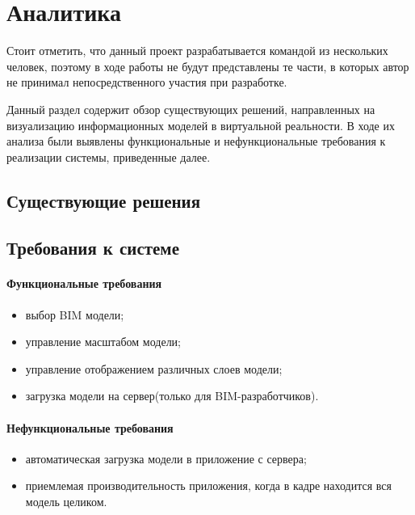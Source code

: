﻿\section{Аналитика}

Стоит отметить, что данный проект разрабатывается командой из нескольких человек,
поэтому в ходе работы не будут представлены те части,
в которых автор не принимал непосредственного участия при разработке.

Данный раздел содержит обзор существующих решений,
направленных на визуализацию информационных моделей в виртуальной реальности.
В ходе их анализа были выявлены функциональные и нефункциональные требования
к реализации системы, приведенные далее. 

\subsection{Существующие решения}
\lipsum[2]

\subsection{Требования к системе}
\paragraph{Функциональные требования}
\begin{itemize}
    \item выбор BIM модели;
    \item управление масштабом модели;
    \item управление отображением различных слоев модели;
    \item загрузка модели на сервер(только для BIM-разработчиков).
\end{itemize}

\paragraph{Нефункциональные требования}
\begin{itemize}
    \item автоматическая загрузка модели в приложение с сервера;
    \item приемлемая производительность приложения, когда в кадре находится вся модель целиком.
\end{itemize}